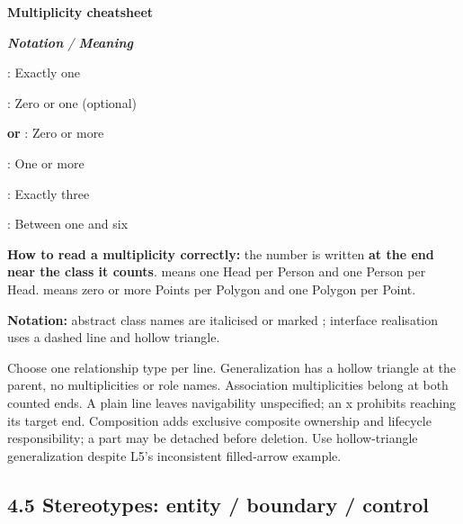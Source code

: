 \begin{studycolumns}
\textbf{Multiplicity cheatsheet}


\begin{referenceentries}
\textit{\textbf{Notation} / \textbf{Meaning}}\par\smallskip
\noindent \textbf{}: Exactly one\par
\noindent \textbf{}: Zero or one (optional)\par
\noindent \textbf{\code{*} or }: Zero or more\par
\noindent \textbf{}: One or more\par
\noindent \textbf{}: Exactly three\par
\noindent \textbf{}: Between one and six\par
\end{referenceentries}
\textbf{How to read a multiplicity correctly:} the number is written \textbf{at the end near the class it counts}.  means one Head per Person and one Person per Head.  means zero or more Points per Polygon and one Polygon per Point.

\textbf{Notation:} abstract class names are italicised or marked ; interface realisation uses a dashed line and hollow triangle.

\par{}\par
Choose one relationship type per line. Generalization has a hollow triangle at the parent, no multiplicities or role names. Association multiplicities belong at both counted ends. A plain line leaves navigability unspecified; an x prohibits reaching its target end. Composition adds exclusive composite ownership and lifecycle responsibility; a part may be detached before deletion. Use hollow-triangle generalization despite L5's inconsistent filled-arrow example.
\par\smallskip
\end{studycolumns}

\subsection*{4.5 Stereotypes: entity /\allowbreak{} boundary /\allowbreak{} control}


